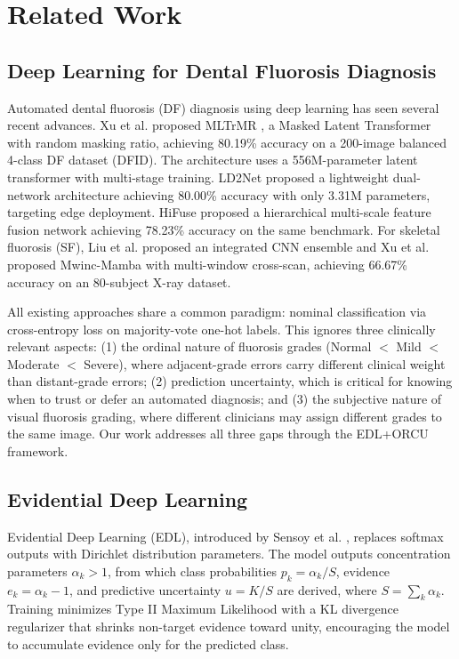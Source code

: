 \section{Related Work}

\subsection{Deep Learning for Dental Fluorosis Diagnosis}

Automated dental fluorosis (DF) diagnosis using deep learning has seen several recent advances. Xu et al. proposed MLTrMR \cite{xu2025mltrmr}, a Masked Latent Transformer with random masking ratio, achieving 80.19\% accuracy on a 200-image balanced 4-class DF dataset (DFID). The architecture uses a 556M-parameter latent transformer with multi-stage training. LD2Net \cite{li2026ld2net} proposed a lightweight dual-network architecture achieving 80.00\% accuracy with only 3.31M parameters, targeting edge deployment. HiFuse \cite{huo2024hifuse} proposed a hierarchical multi-scale feature fusion network achieving 78.23\% accuracy on the same benchmark. For skeletal fluorosis (SF), Liu et al. \cite{liu2021integrated} proposed an integrated CNN ensemble and Xu et al. \cite{xu2025mwinc} proposed Mwinc-Mamba with multi-window cross-scan, achieving 66.67\% accuracy on an 80-subject X-ray dataset.

All existing approaches share a common paradigm: nominal classification via cross-entropy loss on majority-vote one-hot labels. This ignores three clinically relevant aspects: (1) the ordinal nature of fluorosis grades (Normal $<$ Mild $<$ Moderate $<$ Severe), where adjacent-grade errors carry different clinical weight than distant-grade errors; (2) prediction uncertainty, which is critical for knowing when to trust or defer an automated diagnosis; and (3) the subjective nature of visual fluorosis grading, where different clinicians may assign different grades to the same image. Our work addresses all three gaps through the EDL+ORCU framework.

\subsection{Evidential Deep Learning}

Evidential Deep Learning (EDL), introduced by Sensoy et al. \cite{sensoy2018edl}, replaces softmax outputs with Dirichlet distribution parameters. The model outputs concentration parameters $\alpha_k > 1$, from which class probabilities $p_k = \alpha_k / S$, evidence $e_k = \alpha_k - 1$, and predictive uncertainty $u = K / S$ are derived, where $S = \sum_k \alpha_k$. Training minimizes Type II Maximum Likelihood with a KL divergence regularizer that shrinks non-target evidence toward unity, encouraging the model to accumulate evidence only for the predicted class.

